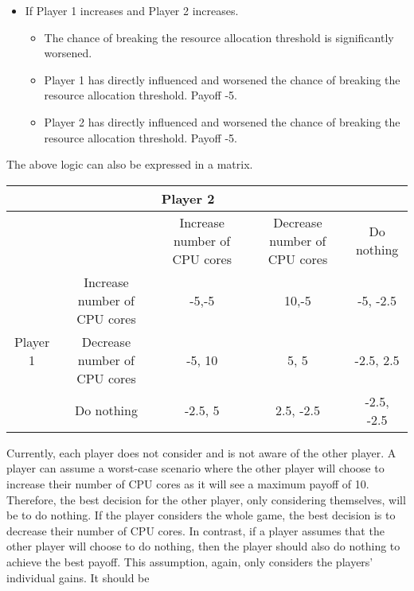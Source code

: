 \begin{itemize}
  \item
    If Player 1 increases and Player 2 increases.
    \begin{itemize}
    \item
     The chance of breaking the resource allocation threshold is
      significantly worsened.
    \item
      Player 1 has directly influenced and worsened the chance of
      breaking the resource allocation threshold. Payoff -5.
    \item
      Player 2 has directly influenced and worsened the chance of
      breaking the resource allocation threshold. Payoff -5.
    \end{itemize}
\end{itemize}
The above logic can also be expressed in a matrix.
\begin{table}[H]
\centering
\begin{adjustbox}{width=\textwidth}
\begin{tabular}{|c|c|c|c|c|}
\hline
&     & \multicolumn{3}{l|}{Player 2} \\
\hline
      &  & Increase number of CPU cores & Decrease number of CPU cores & Do nothing \\ \hline
\multirow{3}{*}{Player 1} & Increase number of CPU cores & -5,-5                        & 10,-5                        & -5, -2.5   \\ \hline
                          & Decrease number of CPU cores & -5, 10                       & 5, 5                         & -2.5, 2.5  \\ \hline
    & Do nothing                   & -2.5, 5                      & 2.5, -2.5                    & -2.5, -2.5  \\ \hline
\end{tabular}
\end{adjustbox}
\end{table}
Currently, each player does not consider and is not aware of the
other player. A player can assume a worst-case scenario where the other
player will choose to increase their number of CPU cores as it will see
a maximum payoff of 10. Therefore, the best decision for the other
player, only considering themselves, will be to do nothing. If the
player considers the whole game, the best decision is to decrease their
number of CPU cores. In contrast, if a player assumes that the other
player will choose to do nothing, then the player should also do nothing
to achieve the best payoff. This assumption, again, only considers the
players' individual gains. It should be
